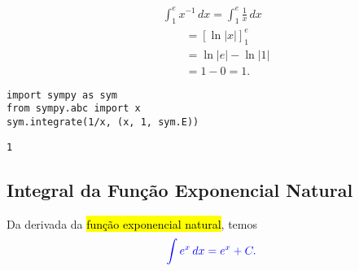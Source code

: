 \begin{ex}

  \begin{align}
    & \int_1^e x^{-1}\,dx = \int_1^e \frac{1}{x}\,dx\\
    &\text{}\qquad = \left[ \ln|x|\right]_1^e \\
    &\text{}\qquad = \ln|e| - \ln|1| \\
    &\text{}\qquad = 1 - 0 = 1.
  \end{align}

\begin{lstlisting}
import sympy as sym
from sympy.abc import x
sym.integrate(1/x, (x, 1, sym.E))
\end{lstlisting}

\begin{verbatim}
1
\end{verbatim}
  
\end{ex}

\subsection{Integral da Função Exponencial Natural}\label{cap_int_subsec_funexp}

Da derivada da \hl{função exponencial natural}, temos
\begin{equation}\color{blue}\int e^x\,dx = e^x + C.
\end{equation}

